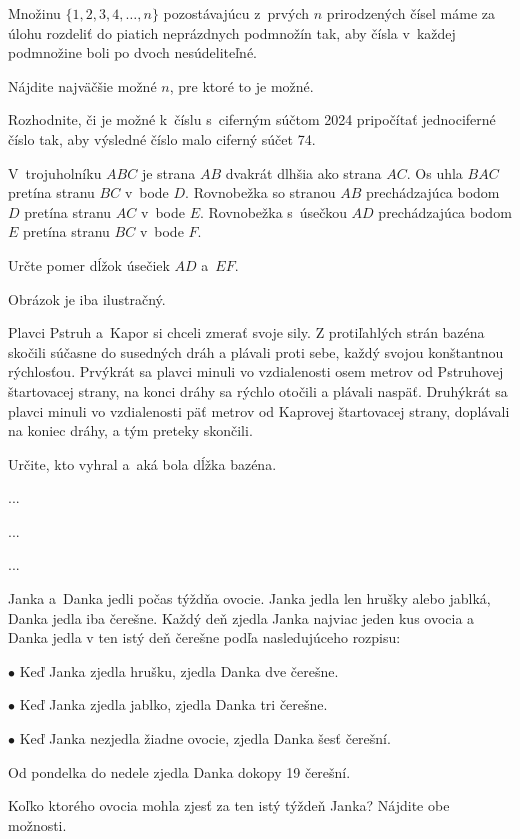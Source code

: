 {%
Množinu $\{1, 2, 3, 4, \dots, n\}$ pozostávajúcu z~prvých $n$ prirodzených čísel máme za úlohu rozdeliť do piatich neprázdnych podmnožín tak, aby čísla v~každej podmnožine boli po dvoch nesúdeliteľné.

Nájdite najväčšie možné $n$, pre ktoré to je možné.
}

{%
Rozhodnite, či je možné k~číslu s~ciferným súčtom 2024 pripočítať jednociferné číslo tak, aby výsledné číslo malo ciferný súčet 74.
}

{%
V~trojuholníku $ABC$ je strana $AB$ dvakrát dlhšia ako strana $AC$.
Os uhla $BAC$ pretína stranu $BC$ v~bode $D$.
Rovnobežka so stranou $AB$ prechádzajúca bodom $D$ pretína stranu $AC$ v~bode $E$.
Rovnobežka s~úsečkou $AD$ prechádzajúca bodom $E$ pretína stranu $BC$ v~bode $F$.

Určte pomer dĺžok úsečiek $AD$ a~$EF$.
%

\poznamka
Obrázok je iba ilustračný.
}

{%
Plavci Pstruh a~Kapor si chceli zmerať svoje sily.
Z protiľahlých strán bazéna skočili súčasne do susedných dráh a plávali proti sebe, každý svojou konštantnou rýchlosťou.
Prvýkrát sa plavci minuli vo vzdialenosti osem metrov od Pstruhovej štartovacej strany, na konci dráhy sa rýchlo otočili a plávali naspäť.
Druhýkrát sa plavci minuli vo vzdialenosti päť metrov od Kaprovej štartovacej strany, doplávali na koniec dráhy, a tým preteky skončili.

Určite, kto vyhral a~aká bola dĺžka bazéna.
}

{%
...}

{%
...}

{%
...}

{%
Janka a~Danka jedli počas týždňa ovocie. Janka jedla len hrušky alebo jablká, Danka jedla iba čerešne.
Každý deň zjedla Janka najviac jeden kus ovocia a Danka jedla v ten istý deň čerešne podľa nasledujúceho rozpisu:

\smallskip
\item{$\bullet$} Keď Janka zjedla hrušku, zjedla Danka dve čerešne.
\item{$\bullet$} Keď Janka zjedla jablko, zjedla Danka tri čerešne.
\item{$\bullet$} Keď Janka nezjedla žiadne ovocie, zjedla Danka šesť čerešní.

\smallskip\noindent
Od pondelka do nedele zjedla Danka dokopy 19 čerešní.

Koľko ktorého ovocia mohla zjesť za ten istý týždeň Janka? Nájdite obe možnosti.
}

